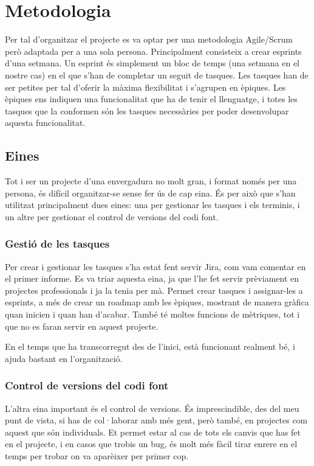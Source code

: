 ﻿\documentclass{article}
\begin{document}
\section{Metodologia}
Per tal d'organitzar el projecte es va optar per una metodologia Agile/Scrum
però adaptada per a una sola persona. Principalment consisteix a crear esprints
d'una setmana. Un esprint és simplement un bloc de temps (una setmana en el
nostre cas) en el que s'han de completar un seguit de tasques. Les tasques han
de ser petites per tal d'oferir la màxima flexibilitat i s'agrupen en èpiques.
Les èpiques ens indiquen una funcionalitat que ha de tenir el llenguatge, i
totes les tasques que la conformen són les tasques necessàries per poder
desenvolupar aquesta funcionalitat.

\subsection{Eines}
Tot i ser un projecte d'una envergadura no molt gran, i format només per una
persona, és difícil organitzar-se sense fer ús de cap eina. És per això que
s'han utilitzat principalment dues eines: una per gestionar les tasques i els
terminis, i un altre per gestionar el control de versions del codi font.

\subsubsection{Gestió de les tasques} Per crear i gestionar les tasques s'ha
estat fent servir Jira, com vam comentar en el primer informe. Es va triar
aquesta eina, ja que l'he fet servir prèviament en projectes professionals i ja
la tenia per mà. Permet crear tasques i assignar-les a esprints, a més de crear
un roadmap amb les èpiques, mostrant de manera gràfica quan inicien i quan han
d'acabar. També té moltes funcions de mètriques, tot i que no es faran servir en
aquest projecte.

En el temps que ha transcorregut des de l'inici, està funcionant realment bé, i
ajuda bastant en l'organització.

\subsubsection{Control de versions del codi font} L'altra eina important és el
control de versions. És imprescindible, des del meu punt de vista, si has de
col·laborar amb més gent, però també, en projectes com aquest que són
individuals. Et permet estar al cas de tots els canvis que has fet en el
projecte, i en casos que trobis un bug, és molt més fàcil tirar enrere en el
temps per trobar on va aparèixer per primer cop.
\end{document}

